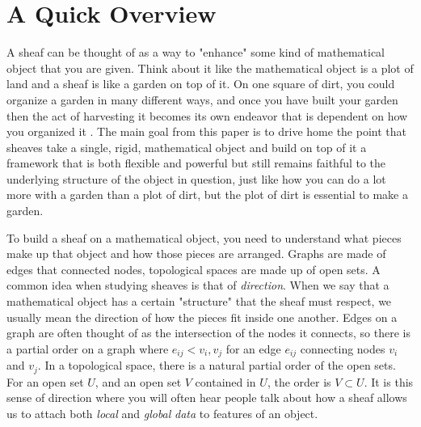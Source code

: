 \documentclass{tufte-handout}
\begin{document}
\section{A Quick Overview}
A sheaf can be thought of as a way to "enhance" some kind of mathematical object that you are given. Think about it like the mathematical object is a plot of land and a sheaf is like a garden on top of it. On one square of dirt, you could organize a garden in many different ways, and once you have built your garden then the act of harvesting it becomes its own endeavor that is dependent on how you organized it%
%
. The main goal from this paper is to drive home the point that sheaves take a single, rigid, mathematical object and build on top of it a framework that is both flexible and powerful but still remains faithful to the underlying structure of the object in question, just like how you can do a lot more with a garden than a plot of dirt, but the plot of dirt is essential to make a garden. 

To build a sheaf on a mathematical object, you need to understand what pieces make up that object and how those pieces are arranged. Graphs are made of edges that connected nodes, topological spaces are made up of open sets. A common idea when studying sheaves is that of \emph{direction}. When we say that a mathematical object has a certain "structure" that the sheaf must respect, we usually mean the direction of how the pieces fit inside one another. Edges on a graph are often thought of as the intersection of the nodes it connects, so there is a partial order on a graph where $e_{ij} < v_i,v_j$ for an edge $e_{ij}$ connecting nodes $v_i$ and $v_j$. In a topological space, there is a natural partial order of the open sets. For an open set $U$, and an open set $V$ contained in $U$, the order is $V \subset U$. It is this sense of direction where you will often hear people talk about how a sheaf allows us to attach both \emph{local} and \emph{global} \emph{data}%
to features of an object. 
\end{document}
